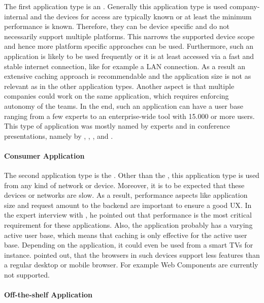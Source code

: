 The first application type is an .
Generally this application type is used company-internal and the devices for access are typically known or at least the minimum performance is known.
Therefore, they can be device specific and do not necessarily support multiple platforms.
This narrows the supported device scope and hence more platform specific approaches can be used.
Furthermore, such an application is likely to be used frequently or it is at least accessed via a fast and stable internet connection, like for example a \ac{LAN} connection.
As a result an extensive caching approach is recommendable and the application size is not as relevant as in the other application types.
Another aspect is that multiple companies could work on the same application, which requires enforcing autonomy of the teams.
In the end, such an application can have a user base ranging from a few experts to an enterprise-wide tool with 15.000 or more users.
This type of application was mostly named by experts and in conference presentations, namely by \textcite{Laug.2018}, \textciteRehm{}, \textciteHuber{}, \textciteSteyer{} and \textciteOlleck{}.



\paragraph{Consumer Application}\label{cha:scenarios_consumer}

The second application type is the .
Other than the , this application type is used from any kind of network or device.
Moreover, it is to be expected that these devices or networks are slow.
As a result, performance aspects like application size and request amount to the backend are important to ensure a good \ac{UX}.
In the expert interview with \textciteJovanovic{}, he pointed out that performance is the most critical requirement for these applications.
Also, the application probably has a varying active user base, which means that caching is only effective for the active user base.
Depending on the application, it could even be used from a smart TVs for instance.
\textciteMezzalira{} pointed out, that the browsers in such devices support less features than a regular desktop or mobile browser.
For example Web Components are currently not supported.



\paragraph{Off-the-shelf Application}\label{cha:scenarios_offshelf}

